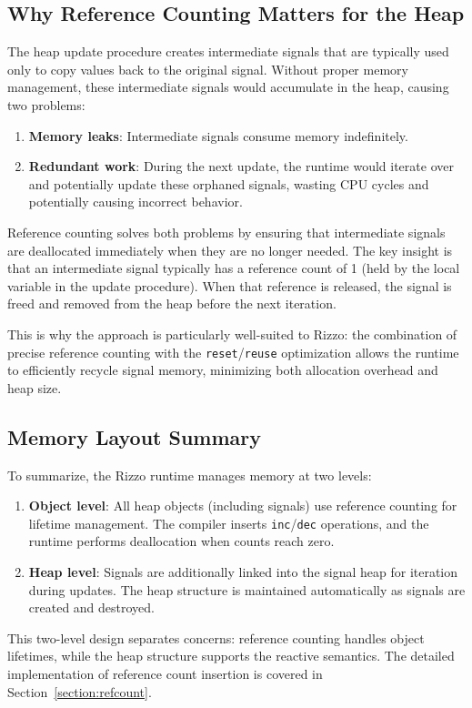 \subsection{Why Reference Counting Matters for the Heap}

The heap update procedure creates intermediate signals that are typically used only to copy values back to the original signal. Without proper memory management, these intermediate signals would accumulate in the heap, causing two problems:

\begin{enumerate}
    \item \textbf{Memory leaks}: Intermediate signals consume memory indefinitely.

    \item \textbf{Redundant work}: During the next update, the runtime would iterate over and potentially update these orphaned signals, wasting CPU cycles and potentially causing incorrect behavior.
\end{enumerate}

Reference counting solves both problems by ensuring that intermediate signals are deallocated immediately when they are no longer needed. The key insight is that an intermediate signal typically has a reference count of 1 (held by the local variable in the update procedure). When that reference is released, the signal is freed and removed from the heap before the next iteration.

This is why the  approach is particularly well-suited to Rizzo: the combination of precise reference counting with the \texttt{reset}/\texttt{reuse} optimization allows the runtime to efficiently recycle signal memory, minimizing both allocation overhead and heap size.

\subsection{Memory Layout Summary}

To summarize, the Rizzo runtime manages memory at two levels:

\begin{enumerate}
    \item \textbf{Object level}: All heap objects (including signals) use reference counting for lifetime management. The compiler inserts \texttt{inc}/\texttt{dec} operations, and the runtime performs deallocation when counts reach zero.

    \item \textbf{Heap level}: Signals are additionally linked into the signal heap for iteration during updates. The heap structure is maintained automatically as signals are created and destroyed.
\end{enumerate}

This two-level design separates concerns: reference counting handles object lifetimes, while the heap structure supports the reactive semantics. The detailed implementation of reference count insertion is covered in Section~\ref{section:refcount}.

